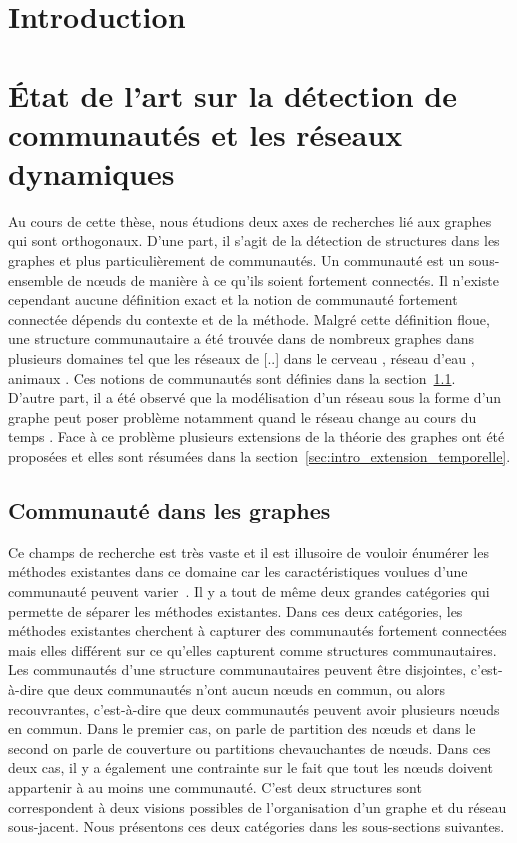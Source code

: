 
\chapter*{Introduction}

\chapter{État de l'art sur la détection de communautés et les réseaux dynamiques}
\minitoc
Au cours de cette thèse, nous étudions deux axes de recherches lié aux graphes qui sont orthogonaux.
D'une part, il s'agit de la détection de structures dans les graphes et plus particulièrement de communautés.
Un communauté est un sous-ensemble de n\oe uds de manière à ce qu'ils soient fortement connectés.
Il n'existe cependant aucune définition exact et la notion de communauté fortement connectée dépends du contexte et de la méthode.
Malgré cette définition floue, une structure communautaire a été trouvée dans de nombreux graphes dans plusieurs domaines tel que les réseaux de [..] dans le cerveau \cite{DeReus2014}, réseau d'eau \cite{DiNardo2015} , animaux \cite{Farine2015}\REF .
Ces notions de communautés sont définies dans la section~\ref{sec:intro_communaute}.\\

D'autre part, il a été observé que la modélisation d'un réseau sous la forme d'un graphe peut poser problème notamment quand le réseau change au cours du temps \REF.
Face à ce problème plusieurs extensions de la théorie des graphes ont été proposées et elles sont résumées dans la section~\ref{sec:intro_extension_temporelle}.



\section{Communauté dans les graphes}
\label{sec:intro_communaute}

Ce champs de recherche est très vaste et il est illusoire de vouloir énumérer les méthodes existantes dans ce domaine car les caractéristiques voulues d'une communauté peuvent varier~\cite{Coscia2011}.
Il y a tout de même deux grandes catégories qui permette de séparer les méthodes existantes.
Dans ces deux catégories, les méthodes existantes cherchent à capturer 
des communautés fortement connectées mais elles différent sur ce qu'elles capturent comme structures communautaires.
Les communautés d'une structure communautaires peuvent être disjointes, c'est-à-dire que deux communautés n'ont aucun n\oe uds en commun, ou alors recouvrantes, c'est-à-dire que deux communautés peuvent avoir plusieurs n\oe uds en commun.
Dans le premier cas, on parle de partition des n\oe uds et dans le second on parle de couverture ou partitions chevauchantes de n\oe uds.
Dans ces deux cas, il y a également une contrainte sur le fait que tout les n\oe uds doivent appartenir à au moins une communauté.
C'est deux structures sont correspondent à deux visions possibles de l'organisation d'un graphe et du réseau sous-jacent.
Nous présentons ces deux catégories dans les sous-sections suivantes.

